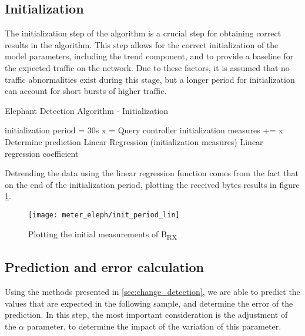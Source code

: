 \subsection{Initialization}

The initialization step of the algorithm is a crucial step for obtaining correct results in the algorithm. This step allows for the correct initialization of the
model parameters, including the trend component, and to provide a baseline for the expected traffic on the network. Due to these factors, it is assumed that no 
traffic abnormalities exist during this stage, but a longer period for initialization can account for short bursts of higher traffic.

\begin{algorithm}[H]
    \caption{Elephant Detection Algorithm - Initialization} \label{alg:high_level}
    \begin{algorithmic}[1]
            \State initialization period = 30s
                \State x = Query controller
                \State initialization measures += x
                \State Determine prediction
            \EndWhile
            \State Linear Regression (initialization measures)
        \State \Return Linear regression coefficient
    \end{algorithmic}
\end{algorithm}

\par Detrending the data using the linear regression function comes from the fact that on the end of the initialization period, plotting the received bytes results
in figure \ref{fig:init_plot}.

\begin{figure} 
    \centering
    \texttt{[image: meter\_eleph/init\_period\_lin]}
    \caption {Plotting the initial measurements of B\textsubscript{RX}}
    \label{fig:init_plot}
\end{figure} 

\subsection{Prediction and error calculation}

Using the methods presented in \ref{sec:change_detection}, we are able to predict the values that are expected in the following sample, and determine the error of
the prediction. In this step, the most important consideration is the adjustment of the $\alpha$ parameter, to determine the impact of the variation of
this parameter.

